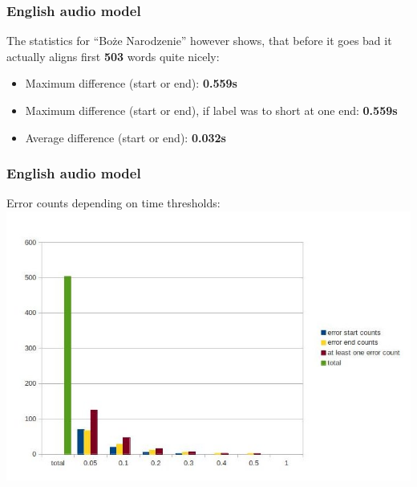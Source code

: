 \documentclass[]{beamer}
\begin{document}
\begin{frame}
    \frametitle{English audio model}
    The statistics for “Boże Narodzenie” however shows, that before it goes bad it actually aligns first \textbf{503} words quite nicely:
    \begin{itemize}
        \item Maximum difference (start or end): 			\textbf{0.559s}
        \item Maximum difference (start or end), if label was to short at one end: 			\textbf{0.559s}
        \item Average difference  (start or end):			\textbf{0.032s}
    \end{itemize}
\end{frame}
\begin{frame}
    \frametitle{English audio model}
    Error counts depending on time thresholds:
    \includegraphics[scale=0.33]{boze_narodzenie_word_english_results.jpg}
\end{frame}
\end{document}
